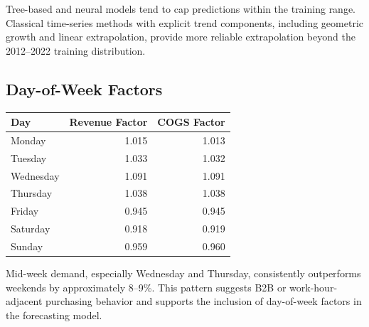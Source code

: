 \documentclass[12pt,a4paper]{article}
\begin{document}
Tree-based and neural models tend to cap predictions within the training range. Classical time-series methods with explicit trend components, including geometric growth and linear extrapolation, provide more reliable extrapolation beyond the 2012--2022 training distribution.

\subsection{Day-of-Week Factors}
\label{sec:day-of-week-factors}

\begin{center}
\centering
{}
\label{tab:dow-factors}
\small
\begin{tabular}{lrr}
\toprule
\textbf{Day} & \textbf{Revenue Factor} & \textbf{COGS Factor} \\
\midrule
Monday & 1.015 & 1.013 \\
Tuesday & 1.033 & 1.032 \\
Wednesday & 1.091 & 1.091 \\
Thursday & 1.038 & 1.038 \\
Friday & 0.945 & 0.945 \\
Saturday & 0.918 & 0.919 \\
Sunday & 0.959 & 0.960 \\
\bottomrule
\end{tabular}
\end{center}

Mid-week demand, especially Wednesday and Thursday, consistently outperforms weekends by approximately 8--9\%. This pattern suggests B2B or work-hour-adjacent purchasing behavior and supports the inclusion of day-of-week factors in the forecasting model.

\newpage
\end{document}
